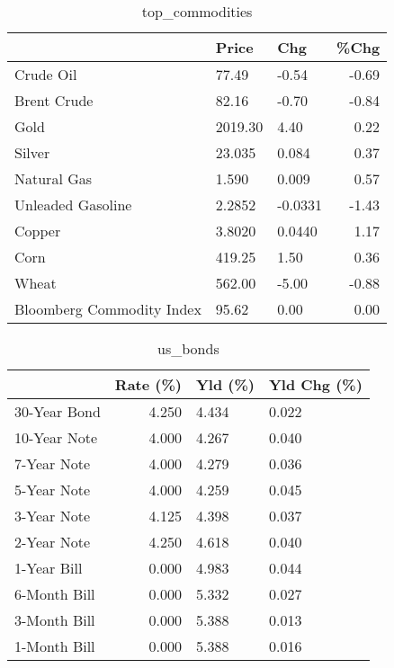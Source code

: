 \documentclass{article}%
\begin{document}
\begin{table}[htbp]%
\caption{top\_commodities}%
\centering%
\begin{adjustbox}{width=1\textwidth}%
\begin{tabular}{lllr}
\toprule
                          &   Price &     Chg &  \%Chg \\
\midrule
               Crude Oil  &   77.49 &   -0.54 & -0.69 \\
             Brent Crude  &   82.16 &   -0.70 & -0.84 \\
                    Gold  & 2019.30 &    4.40 &  0.22 \\
                  Silver  &  23.035 &   0.084 &  0.37 \\
             Natural Gas  &   1.590 &   0.009 &  0.57 \\
       Unleaded Gasoline  &  2.2852 & -0.0331 & -1.43 \\
                  Copper  &  3.8020 &  0.0440 &  1.17 \\
                    Corn  &  419.25 &    1.50 &  0.36 \\
                   Wheat  &  562.00 &   -5.00 & -0.88 \\
Bloomberg Commodity Index &   95.62 &    0.00 &  0.00 \\
\bottomrule
\end{tabular}
%
\end{adjustbox}%
\end{table}

%


\begin{table}[htbp]%
\caption{us\_bonds}%
\centering%
\begin{adjustbox}{width=1\textwidth}%
\begin{tabular}{lrll}
\toprule
             &  Rate (\%) & Yld (\%) & Yld Chg (\%) \\
\midrule
30-Year Bond &     4.250 &   4.434 &       0.022 \\
10-Year Note &     4.000 &   4.267 &       0.040 \\
 7-Year Note &     4.000 &   4.279 &       0.036 \\
 5-Year Note &     4.000 &   4.259 &       0.045 \\
 3-Year Note &     4.125 &   4.398 &       0.037 \\
 2-Year Note &     4.250 &   4.618 &       0.040 \\
 1-Year Bill &     0.000 &   4.983 &       0.044 \\
6-Month Bill &     0.000 &   5.332 &       0.027 \\
3-Month Bill &     0.000 &   5.388 &       0.013 \\
1-Month Bill &     0.000 &   5.388 &       0.016 \\
\bottomrule
\end{tabular}
%
\end{adjustbox}%
\end{table}
\end{document}

